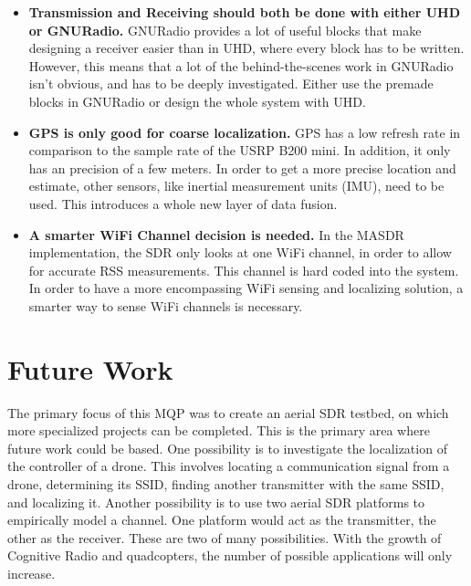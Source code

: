 \begin{itemize}
 \item \textbf{Transmission and Receiving should both be done with either UHD or GNURadio.} 
                GNURadio provides a lot of useful blocks that make designing a receiver easier than in
                UHD, where every block has to be written. However, this means that a lot of the behind-the-scenes
                work in GNURadio isn't obvious, and has to be deeply investigated. Either use the premade blocks 
                in GNURadio or design the whole system with UHD.
 \item \textbf{GPS is only good for coarse localization.} 
                GPS has a low refresh rate in comparison to the 
                sample rate of the USRP B200 mini. In addition, it only has an precision of
                a few meters. In order to get a more precise location and estimate,
                other sensors, like inertial measurement units (IMU), need to be used. 
                This introduces a whole new layer of data fusion.
 \item \textbf{A smarter WiFi Channel decision is needed.} 
                In the MASDR implementation, the SDR
                only looks at one WiFi channel, in order to allow for accurate RSS measurements. 
                This channel is hard coded into the system. In order to have a more encompassing 
                WiFi sensing and localizing solution, a smarter way to sense WiFi channels is 
                necessary.
\end{itemize} \par

\section{Future Work}
The primary focus of this MQP was to create an aerial SDR testbed, on which more 
specialized projects can be completed. This is the primary area where future work
could be based. One possibility is to investigate the localization of the controller
of a drone. This involves locating a communication signal from a drone, determining its
SSID, finding another transmitter with the same SSID, and localizing it. Another possibility
is to use two aerial SDR platforms to empirically model a channel. One platform
would act as the transmitter, the other as the receiver. These are two of many possibilities.
With the growth of Cognitive Radio and quadcopters, the number of possible applications
will only increase.\par

